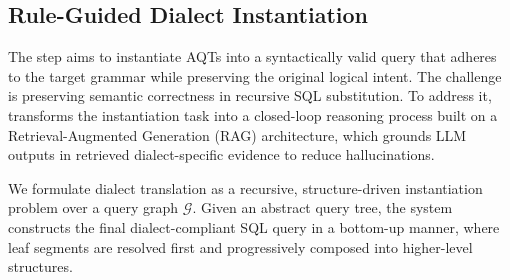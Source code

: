 \documentclass[sigconf,review,anonymous]{acmart}
\begin{document}
\subsection{Rule-Guided Dialect Instantiation}
\label{sec:translation}
The step aims to instantiate AQTs into a syntactically valid query that adheres to the target grammar while preserving the original logical intent.
The challenge is preserving semantic correctness in recursive SQL substitution.
To address it, \tool{} transforms the instantiation task into a closed-loop reasoning process built on a Retrieval-Augmented Generation (RAG) architecture, which grounds LLM outputs in retrieved dialect-specific evidence to reduce hallucinations. 

We formulate dialect translation as a recursive, structure-driven instantiation problem over a query graph $\mathcal{G}$. Given an abstract query tree, the system constructs the final dialect-compliant SQL query in a bottom-up manner, where leaf segments are resolved first and progressively composed into higher-level structures. 
\end{document}
